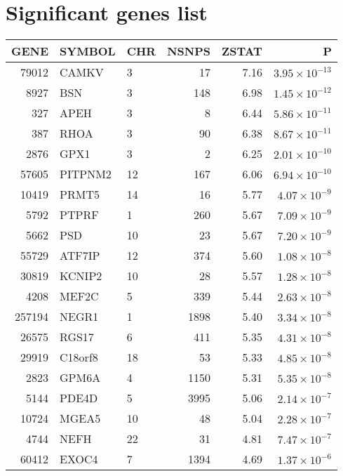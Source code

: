 
\section{Significant genes list}

\begin{table}[ht]
\centering
\begin{tabular}{rllrrr}
  \hline
GENE & SYMBOL & CHR & NSNPS & ZSTAT & P \\ 
  \hline
79012 & CAMKV & 3 &  17 & 7.16 & $3.95 \times 10^{-13}$ \\ 
  8927 & BSN & 3 & 148 & 6.98 & $1.45 \times 10^{-12}$ \\ 
  327 & APEH & 3 &   8 & 6.44 & $5.86 \times 10^{-11}$ \\ 
  387 & RHOA & 3 &  90 & 6.38 & $8.67 \times 10^{-11}$ \\ 
  2876 & GPX1 & 3 &   2 & 6.25 & $2.01 \times 10^{-10}$ \\ 
  57605 & PITPNM2 & 12 & 167 & 6.06 & $6.94 \times 10^{-10}$ \\ 
  10419 & PRMT5 & 14 &  16 & 5.77 & $4.07 \times 10^{-9}$ \\ 
  5792 & PTPRF & 1 & 260 & 5.67 & $7.09 \times 10^{-9}$ \\ 
  5662 & PSD & 10 &  23 & 5.67 & $7.20 \times 10^{-9}$ \\ 
  55729 & ATF7IP & 12 & 374 & 5.60 & $1.08 \times 10^{-8}$ \\ 
  30819 & KCNIP2 & 10 &  28 & 5.57 & $1.28 \times 10^{-8}$ \\ 
  4208 & MEF2C & 5 & 339 & 5.44 & $2.63 \times 10^{-8}$ \\ 
  257194 & NEGR1 & 1 & 1898 & 5.40 & $3.34 \times 10^{-8}$ \\ 
  26575 & RGS17 & 6 & 411 & 5.35 & $4.31 \times 10^{-8}$ \\ 
  29919 & C18orf8 & 18 &  53 & 5.33 & $4.85 \times 10^{-8}$ \\ 
  2823 & GPM6A & 4 & 1150 & 5.31 & $5.35 \times 10^{-8}$ \\ 
  5144 & PDE4D & 5 & 3995 & 5.06 & $2.14 \times 10^{-7}$ \\ 
  10724 & MGEA5 & 10 &  48 & 5.04 & $2.28 \times 10^{-7}$ \\ 
  4744 & NEFH & 22 &  31 & 4.81 & $7.47 \times 10^{-7}$ \\ 
  60412 & EXOC4 & 7 & 1394 & 4.69 & $1.37 \times 10^{-6}$ \\ 

\end{tabular}
\end{table}
